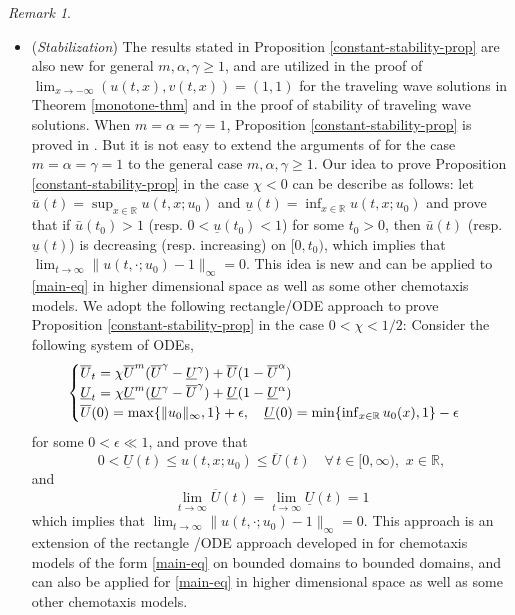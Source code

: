 \documentclass[11pt]{article} %
\theoremstyle{remark}
\newtheorem{remark}{Remark}[section]
\theoremstyle{remark}
\numberwithin{equation}{section}
\numberwithin{figure}{section}
\numberwithin{table}{section}
\newcommand\RR{\ensuremath{\mathbb{R}}}
\begin{document}
\begin{remark}
\begin{itemize}
\item[(2)] ({\it Stabilization}) The results stated in Proposition \ref{constant-stability-prop} are also new for general $m,\alpha,\gamma\ge 1$, and are utilized in the proof of $\lim_{x\to -\infty}(u(t,x),v(t,x))=(1,1)$ for the traveling wave solutions in Theorem \ref{monotone-thm} and  in the proof of stability of traveling wave solutions. When $m=\alpha=\gamma=1$,  Proposition \ref{constant-stability-prop} is proved in \cite[Theorem B]{SaSh2019}. But it is not easy to extend the arguments of  \cite[Theorem B]{SaSh2019} for the case $m=\alpha=\gamma=1$ to the general case $m,\alpha,\gamma\ge 1$.
Our idea to prove Proposition \ref{constant-stability-prop} in the case $\chi<0$  can be describe as follows: let
$\bar u(t)=\sup_{x\in\RR} u(t,x;u_0)$ and $\underline u(t)=\inf_{x\in\RR}u(t,x;u_0)$ and prove that if $\bar u(t_0)>1$ (resp. $0<\underline u(t_0)<1$) for some $t_0>0$, then
$\bar u(t)$ (resp. $\underline u(t)$) is decreasing (resp. increasing) on $[0,t_0)$, which implies that
$
\lim_{t\to\infty}
\|u(t,\cdot;u_0)-1\|_\infty=0.
$
This idea is new and can be applied to  \eqref{main-eq} in higher dimensional space as well as some other chemotaxis models.  We adopt the following rectangle/ODE approach to prove Proposition \ref{constant-stability-prop} in the case $0<\chi<1/2$:  Consider the following system of ODEs,
$$
\begin{cases}
\overline U_t=\chi \overline U^m (\overline U^\gamma -\underline U^\gamma)+ \overline U(1-\overline U^\alpha)\cr
\underline U_t=\chi \underline U^m (\underline U^\gamma-\overline U^\gamma)+\underline U(1-\underline U^\alpha)\cr
\overline U(0)=\max\{\|u_0\|_\infty, 1\}+\epsilon,\quad \underline U(0)=\min\{\inf_{x\in\RR}u_0(x),1\}-\epsilon
\end{cases}
$$
for some $0<\epsilon\ll 1$, and prove that
\begin{equation*}
0<\underline U(t)\le u(t,x;u_0)\le \overline U(t)\quad \forall\, t\in [0,\infty),\,\, x\in\RR,
\end{equation*}
and
\begin{equation*}
\lim_{t\to\infty} \overline U(t)=\lim_{t\to\infty}\underline U(t)=1
\end{equation*}
which implies that $
\lim_{t\to\infty}
\|u(t,\cdot;u_0)-1\|_\infty=0.
$
This approach is an extension of the rectangle /ODE approach developed in \cite[Theorem 1.2]{GaSaTe} for  chemotaxis models of the form  \eqref{main-eq} on bounded domains to
bounded domains, and  can also be applied for \eqref{main-eq} in higher dimensional space as well as some other chemotaxis models.
\end{itemize}

\end{remark}
\end{document}
